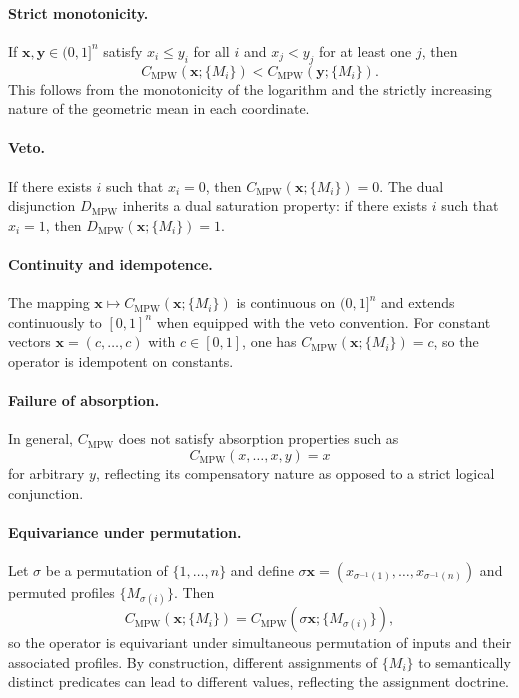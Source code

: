 \documentclass[11pt]{article}
\begin{document}
\paragraph{Strict monotonicity.}
If $\mathbf{x},\mathbf{y} \in (0,1]^n$ satisfy $x_i \le y_i$ for all $i$ and $x_j < y_j$ for at least one $j$, then
\[
  C_{\mathrm{MPW}}(\mathbf{x};\{M_i\}) < C_{\mathrm{MPW}}(\mathbf{y};\{M_i\}).
\]
This follows from the monotonicity of the logarithm and the strictly increasing nature of the geometric mean in each coordinate.

\paragraph{Veto.}
If there exists $i$ such that $x_i = 0$, then $C_{\mathrm{MPW}}(\mathbf{x};\{M_i\}) = 0$. The dual disjunction $D_{\mathrm{MPW}}$ inherits a dual saturation property: if there exists $i$ such that $x_i = 1$, then $D_{\mathrm{MPW}}(\mathbf{x};\{M_i\}) = 1$.

\paragraph{Continuity and idempotence.}
The mapping $\mathbf{x}\mapsto C_{\mathrm{MPW}}(\mathbf{x};\{M_i\})$ is continuous on $(0,1]^n$ and extends continuously to $[0,1]^n$ when equipped with the veto convention. For constant vectors $\mathbf{x} = (c,\dots,c)$ with $c \in [0,1]$, one has $C_{\mathrm{MPW}}(\mathbf{x};\{M_i\}) = c$, so the operator is idempotent on constants.

\paragraph{Failure of absorption.}
In general, $C_{\mathrm{MPW}}$ does not satisfy absorption properties such as
\[
  C_{\mathrm{MPW}}(x,\dots,x,y) = x
\]
for arbitrary $y$, reflecting its compensatory nature as opposed to a strict logical conjunction.

\paragraph{Equivariance under permutation.}
Let $\sigma$ be a permutation of $\{1,\dots,n\}$ and define $\sigma\mathbf{x} = (x_{\sigma^{-1}(1)},\dots,x_{\sigma^{-1}(n)})$ and permuted profiles $\{M_{\sigma(i)}\}$. Then
\[
  C_{\mathrm{MPW}}(\mathbf{x};\{M_i\}) = C_{\mathrm{MPW}}(\sigma\mathbf{x};\{M_{\sigma(i)}\}),
\]
so the operator is equivariant under simultaneous permutation of inputs and their associated profiles. By construction, different assignments of $\{M_i\}$ to semantically distinct predicates can lead to different values, reflecting the assignment doctrine.
\end{document}
